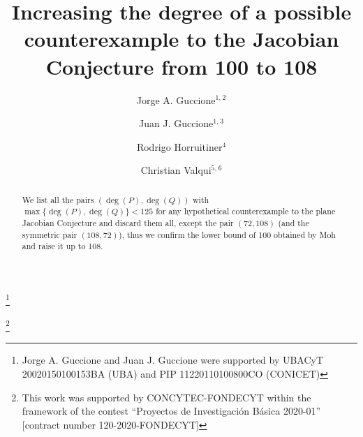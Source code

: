 \documentclass[reqno,a4paper,twoside]{amsart}
\theoremstyle{definition}
\theoremstyle{remark}
\begin{document}
\title{Increasing the degree of a possible counterexample to the Jacobian Conjecture from 100 to 108}

\author[Jorge A. Guccione]{Jorge A. Guccione$^{1,}$$^2$}
\address{$^1$ Universidad de Buenos Aires. Facultad de Ciencias Exactas y Naturales. Departamento de Matem\'atica. Buenos Aires. Argentina}
\address{$^2$ CONICET-Universidad de Buenos Aires. Instituto de Investigaciones Matem\'aticas ``Luis A. santal\'o'' (IMAS). Buenos Aires. Argentina}

\author[Juan J. Guccione]{Juan J. Guccione$^{1,}$$^3$}
\address{$^3$ CONICET. Instituto Argentino de Matem\'atica (IAM). Buenos Aires. Argentina}

\thanks{Jorge A. Guccione and Juan J. Guccione were supported by UBACyT 20020150100153BA (UBA) and PIP 11220110100800CO (CONICET)}

\author[Rodrigo Horruitiner]{Rodrigo Horruitiner$^{4}$}
\address{$^4$Cornell University, Department of Mathematics, 310 Malott Hall, Cornell University, Ithaca, New York, USA.}

\author[Christian Valqui]{Christian Valqui$^{5,}$$^6$}
\address{$^5$Pontificia Universidad Cat\'olica del Per\'u, Secci\'on Matem\'aticas, PUCP, Av. Universitaria 1801, San Miguel, Lima 32, Per\'u.}

\address{$^6$Instituto de Matem\'atica y Ciencias Afines (IMCA) Calle Los Bi\'ologos 245. Urb San C\'esar.
La Molina, Lima 12, Per\'u.}
\thanks{This work was supported by CONCYTEC-FONDECYT within the framework of the contest ``Proyectos de Investigaci\'on B\'asica 2020-01'' [contract number 120-2020-FONDECYT]}



\begin{abstract}
We list all the pairs  $(\deg(P),\deg(Q))$ with $\max\{\deg(P),\deg(Q)\}< 125$ for any hypothetical counterexample to the plane Jacobian Conjecture and discard them all, except the pair $(72,108)$ (and the symmetric pair $(108,72)$), thus we confirm the lower bound of 100 obtained by Moh and raise it up to 108.
\end{abstract}

\maketitle
\end{document}
